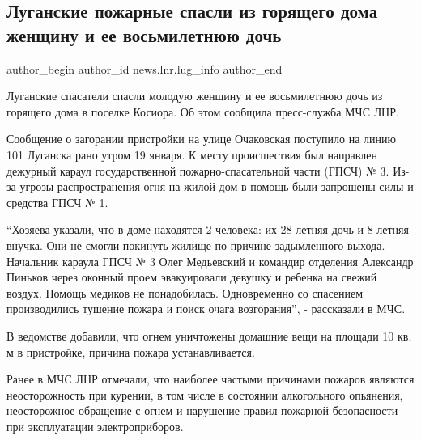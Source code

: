  
 
 
 
 
\subsection{Луганские пожарные спасли из горящего дома женщину и ее восьмилетнюю дочь}
\label{sec:19_01_2022.stz.news.lnr.lug_info.1.spasenie_pozhar}

\ifcmt
 author_begin
   author_id news.lnr.lug_info
 author_end
\fi

Луганские спасатели спасли молодую женщину и ее восьмилетнюю дочь из горящего
дома в поселке Косиора. Об этом сообщила пресс-служба МЧС ЛНР.

Сообщение о загорании пристройки на улице Очаковская поступило на линию 101
Луганска рано утром 19 января. К месту происшествия был направлен дежурный
караул государственной пожарно-спасательной части (ГПСЧ) № 3. Из-за угрозы
распространения огня на жилой дом в помощь были запрошены силы и средства ГПСЧ
№ 1.

\enquote{Хозяева указали, что в доме находятся 2 человека: их 28-летняя дочь и 8-летняя
внучка. Они не смогли покинуть жилище по причине задымленного выхода. Начальник
караула ГПСЧ № 3 Олег Медьевский и командир отделения Александр Пиньков через
оконный проем эвакуировали девушку и ребенка на свежий воздух. Помощь медиков
не понадобилась. Одновременно со спасением производились тушение пожара и поиск
очага возгорания}, - рассказали в МЧС.

В ведомстве добавили, что огнем уничтожены домашние вещи на площади 10 кв. м в
пристройке, причина пожара устанавливается.

Ранее в МЧС ЛНР отмечали, что наиболее частыми причинами пожаров являются
неосторожность при курении, в том числе в состоянии алкогольного опьянения,
неосторожное обращение с огнем и нарушение правил пожарной безопасности при
эксплуатации электроприборов.

